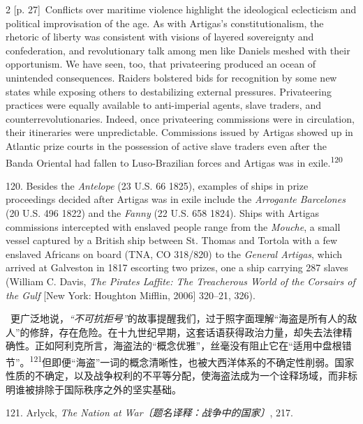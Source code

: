 \documentclass[10pt,a4paper]{article}
\begin{document}
\begin{paracol}{2}
\switchcolumn
{\scriptsize\color{gray} [p. 27]}\ Conflicts over maritime violence highlight the ideological eclecticism and political improvisation of the age. As with Artigas’s constitutionalism, the rhetoric of liberty was consistent with visions of layered sovereignty and confederation, and revolutionary talk among men like Daniels meshed with their opportunism. We have seen, too, that privateering produced an ocean of unintended consequences. Raiders bolstered bids for recognition by some new states while exposing others to destabilizing external pressures. Privateering practices were equally available to anti-imperial agents, slave traders, and counterrevolutionaries. Indeed, once privateering commissions were in circulation, their itineraries were unpredictable. Commissions issued by Artigas showed up in Atlantic prize courts in the possession of active slave traders even after the Banda Oriental had fallen to Luso-Brazilian forces and Artigas was in exile.\nobreak\textsuperscript{120}\par{\small 120. Besides the \textit{Antelope} (23 U.S. 66 1825), examples of ships in prize proceedings decided after Artigas was in exile include the \textit{Arrogante Barcelones} (20 U.S. 496 1822) and the \textit{Fanny} (22 U.S. 658 1824). Ships with Artigas commissions intercepted with enslaved people range from the \textit{Mouche}, a small vessel captured by a British ship between St. Thomas and Tortola with a few enslaved Africans on board (TNA, CO 318/820) to the \textit{General Artigas}, which arrived at Galveston in 1817 escorting two prizes, one a ship carrying 287 slaves (William C. Davis, \textit{The Pirates Laffite: The Treacherous World of the Corsairs of the Gulf} [New York: Houghton Mifflin, 2006] 320–21, 326).\par}
\switchcolumn*
{\scriptsize\color{gray} [p. 27]}\ 更广泛地说，\textit{“不可抗拒号”}的故事提醒我们，过于照字面理解“海盗是所有人的敌人”的修辞，存在危险。在十九世纪早期，这套话语获得政治力量，却失去法律精确性。正如阿利克所言，海盗法的“概念优雅”，丝毫没有阻止它在“适用中盘根错节”。\nobreak\textsuperscript{121}但即便“海盗”一词的概念清晰性，也被大西洋体系的不确定性削弱。国家性质的不确定，以及战争权利的不平等分配，使海盗法成为一个诠释场域，而非标明谁被排除于国际秩序之外的坚实基础。\par{\small 121. Arlyck, \textit{The Nation at War〔题名译释：战争中的国家〕}, 217.\par}
\switchcolumn

\end{paracol}
\end{document}

